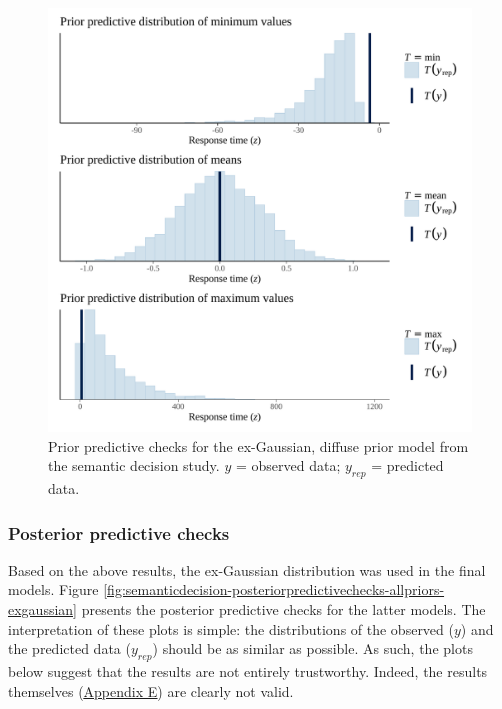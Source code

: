 \documentclass[
  12pt,
  man,floatsintext]{apa7}
\begin{document}
\begin{figure}

{\centering \includegraphics[width=0.8\linewidth]{../semanticdecision/bayesian_analysis/prior_predictive_checks/plots/semanticdecision_priorpredictivecheck_diffusepriors_exgaussian} 

}

\caption{Prior predictive checks for the ex-Gaussian, diffuse prior model from the semantic decision study. \(y\) = observed data; \(y_{rep}\) = predicted data.}\label{fig:semanticdecision-priorpredictivecheck-diffusepriors-exgaussian}
\end{figure}

\hypertarget{posterior-predictive-checks-1}{%
\subsubsection{Posterior predictive checks}\label{posterior-predictive-checks-1}}

Based on the above results, the ex-Gaussian distribution was used in the final models. Figure \ref{fig:semanticdecision-posteriorpredictivechecks-allpriors-exgaussian} presents the posterior predictive checks for the latter models. The interpretation of these plots is simple: the distributions of the observed (\(y\)) and the predicted data (\(y_{rep}\)) should be as similar as possible. As such, the plots below suggest that the results are not entirely trustworthy. Indeed, the results themselves (\protect\hyperlink{appendix-E-Bayesian-analysis-results}{\underline{Appendix E}}) are clearly not valid.
\end{document}
